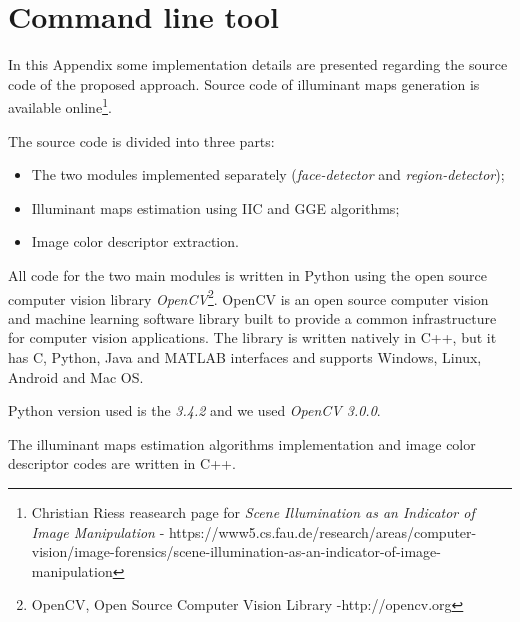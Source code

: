 \chapter{Command line tool}

In this Appendix some implementation details are presented regarding the source code of the proposed approach. Source code of illuminant maps generation is available online\footnote{Christian Riess reasearch page for \emph{Scene Illumination as an Indicator of Image Manipulation} - https://www5.cs.fau.de/research/areas/computer-vision/image-forensics/scene-illumination-as-an-indicator-of-image-manipulation}.

The source code is divided into three parts:
\begin{itemize}
\item The two modules implemented separately (\emph{face-detector} and \emph{region-detector});
\item Illuminant maps estimation using IIC and GGE algorithms;
\item Image color descriptor extraction.
\end{itemize}

All code for the two main modules is written in Python using the open source computer vision library \emph{OpenCV}\footnote{OpenCV, Open Source Computer Vision Library -http://opencv.org}. OpenCV is an open source computer vision and machine learning software library built to provide a common infrastructure for computer vision applications. The library is written natively in C++, but it has C, Python, Java and MATLAB interfaces and supports Windows, Linux, Android and Mac OS.

Python version used is the \emph{3.4.2} and we used \emph{OpenCV 3.0.0}. 

The illuminant maps estimation algorithms implementation and image color descriptor codes are written in C++.

